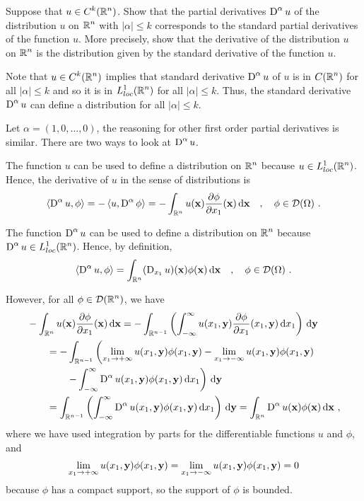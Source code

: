 \begin{egg}
Suppose that $\displaystyle u \in C^k(\mathbb{R}^n)$.  Show that the partial
derivatives $\displaystyle \operatorname{D}^\alpha u$ of the distribution $u$ on
$\displaystyle \mathbb{R}^n$ with $|\alpha|\leq k$
corresponds to the standard partial derivatives of the function $u$.  More
precisely, show that the derivative of the distribution $u$ on
$\displaystyle \mathbb{R}^n$ is the distribution given by the standard
derivative of the function $u$.

Note that $\displaystyle u \in C^k(\mathbb{R}^n)$ implies that standard derivative
$\displaystyle \operatorname{D}^\alpha u$ of $u$ is in $\displaystyle C(\mathbb{R}^n)$
for all $|\alpha|\leq k$ and
so it is in $\displaystyle L_{loc}^1(\mathbb{R}^n)$ for all $|\alpha|\leq k$.
Thus, the standard derivative $\displaystyle \operatorname{D}^\alpha u$ can define a
distribution for all $|\alpha|\leq k$.

Let $\alpha = (1,0,\ldots,0)$, the reasoning for other first order
partial derivatives is similar. There are two ways to look at
$\displaystyle \operatorname{D}^{\alpha} u$.

 The function $u$ can be used to define a
distribution on $\displaystyle \mathbb{R}^n$ because
$\displaystyle u\in L_{loc}^1(\mathbb{R}^n)$.  Hence, the 
derivative of $u$ in the sense of distributions is
\[
\left\langle{\operatorname{D}^\alpha u} , {\phi}\right\rangle = -\left\langle{u} , {\operatorname{D}^\alpha \phi}\right\rangle =
-\int_{\mathbb{R}^n} u(\mathbf{x}) \frac{\partial{\phi}}{\partial x_1}(\mathbf{x}) \,\mathrm{d}{\mathbf{x}}
\quad , \quad \phi \in \mathcal{D}(\Omega) \ .
\]

 The function $\displaystyle \operatorname{D}^\alpha u$ can be used to define a
distribution on $\displaystyle \mathbb{R}^n$ because
$\displaystyle \operatorname{D}^\alpha u\in L_{loc}^1(\mathbb{R}^n)$.
Hence, by definition,
\[
\left\langle{\operatorname{D}^\alpha u} , {\phi}\right\rangle = 
\int_{\mathbb{R}^n} (\operatorname{D}_{x_1}u)(\mathbf{x}) \phi(\mathbf{x}) \,\mathrm{d}{\mathbf{x}}
\quad , \quad \phi \in \mathcal{D}(\Omega) \ .
\]

However, for all $\displaystyle \phi \in \mathcal{D}(\mathbb{R}^n)$, we have
\begin{align*}
&-\int_{\mathbb{R}^n} u(\mathbf{x}) \frac{\partial{\phi}}{\partial x_1}(\mathbf{x}) \,\mathrm{d}{\mathbf{x}}
= -\int_{\mathbb{R}^{n-1}} \left( \int_{-\infty}^\infty u(x_1,\mathbf{y})
\frac{\partial{\phi}}{\partial x_1}(x_1,\mathbf{y})\,\mathrm{d}{x_1}\right) \,\mathrm{d}{\mathbf{y}} \\
&\qquad = -\int_{\mathbb{R}^{n-1}} \left(
\lim_{x_1\rightarrow +\infty}u(x_1,\mathbf{y})\phi(x_1,\mathbf{y})
- \lim_{x_1\rightarrow -\infty}u(x_1,\mathbf{y})\phi(x_1,\mathbf{y}) \right. \\
&\qquad \qquad \left. - \int_{-\infty}^\infty
\operatorname{D}^\alpha u(x_1,\mathbf{y})\phi(x_1,\mathbf{y})\,\mathrm{d}{x_1} \right) \,\mathrm{d}{\mathbf{y}}\\
&\qquad = \int_{\mathbb{R}^{n-1}} \left(\int_{-\infty}^\infty
\operatorname{D}^\alpha u(x_1,\mathbf{y})\phi(x_1,\mathbf{y})\,\mathrm{d}{x_1} \right) \,\mathrm{d}{\mathbf{y}}
= \int_{\mathbb{R}^n} \operatorname{D}^\alpha u(\mathbf{x})\phi(\mathbf{x}) \,\mathrm{d}{\mathbf{x}} \ ,
\end{align*}
where we have used integration by parts for the differentiable functions
$u$ and $\phi$, and
\[
\lim_{x_1\rightarrow +\infty}u(x_1,\mathbf{y})\phi(x_1,\mathbf{y})
= \lim_{x_1\rightarrow -\infty}u(x_1,\mathbf{y})\phi(x_1,\mathbf{y}) = 0
\]
because $\phi$ has a compact support, so the support of $\phi$ is bounded.


\end{egg}
